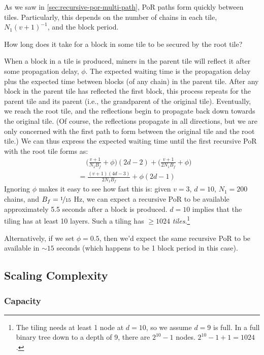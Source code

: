 As we saw in \autoref{sec:recursive-por-multi-path}, PoR paths form quickly between tiles.
Particularly, this depends on the number of chains in each tile, $N_1 (v+1)^{-1}$, and the block period.

How long does it take for a block in some tile to be secured by the root tile?

When a block in a tile is produced, miners in the parent tile will reflect it after some propagation delay, $\phi$.
The expected waiting time is the propagation delay plus the expected time between blocks (of any chain) in the parent tile.
After any block in the parent tile has reflected the first block, this process repeats for the parent tile and its parent (i.e., the grandparent of the original tile).
Eventually, we reach the root tile, and the reflections begin to propagate back down towards the original tile.
(Of course, the reflections propagate in all directions, but we are only concerned with the first path to form between the original tile and the root tile.)
We can thus express the expected waiting time until the first recursive PoR with the root tile forms as:
\begin{align}
    & \;\;\;\; \Big( \frac{v+1}{N_1 B_f} + \phi \Big) (2d-2) + \Big( \frac{v+1}{2 N_1 B_f} + \phi \Big) \nonumber \\
    & = \frac{(v+1)(4d - 3)}{2 N_1 B_f} + \phi(2d - 1)
        \label{eq:tiling-finalization-delay}
\end{align}
Ignoring $\phi$ makes it easy to see how fast this is: given $v = 3$, $d = 10$, $N_1 = 200$ chains, and $B_f = \nicefrac{1}{15}$ Hz, we can expect a recursive PoR to be available approximately 5.5 seconds after a block is produced.
$d = 10$ implies that the tiling has at least 10 layers.
Such a tiling has $\ge 1024$ \emph{tiles}.\footnote{
    The tiling needs at least 1 node at $d=10$, so we assume $d=9$ is full.
    In a full binary tree down to a depth of 9, there are $2^{10} - 1$ nodes.
    $2^{10} - 1 + 1 = 1024$.
}

Alternatively, if we set $\phi = 0.5$, then we'd expect the same recursive PoR to be available in $\sim 15$ seconds (which happens to be 1 block period in this case).


\subsection{Scaling Complexity}

\label{sec:tiling-complexity}

\subsubsection{Capacity}

